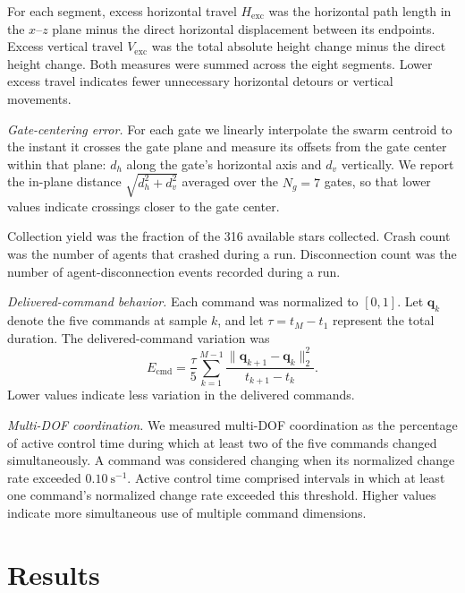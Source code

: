 \documentclass[a4paper,10pt,conference]{ieeeconf}
\begin{document}
For each segment, excess horizontal travel $H_{\mathrm{exc}}$ was the
horizontal path length in the $x$--$z$ plane minus the direct horizontal
displacement between its endpoints. Excess vertical travel
$V_{\mathrm{exc}}$ was the total absolute height change minus the direct
height change. Both measures were summed across the eight segments. Lower
excess travel indicates fewer unnecessary horizontal detours or vertical
movements.

\emph{Gate-centering error.} For each gate we linearly interpolate the swarm
centroid to the instant it crosses the gate plane and measure its offsets from
the gate center within that plane: $d_h$ along the gate's horizontal axis and
$d_v$ vertically. We report the in-plane distance $\sqrt{d_h^2+d_v^2}$ averaged
over the $N_g=7$ gates, so that lower values indicate crossings closer to the
gate center.

Collection yield was the fraction of the 316 available stars collected.
Crash count was the number of agents that crashed during a run.
Disconnection count was the number of agent-disconnection events recorded
during a run.

\emph{Delivered-command behavior.}
Each command was normalized to $[0,1]$. Let $\mathbf{q}_k$ denote the five commands at sample $k$, and let $\tau=t_M-t_1$ represent the total duration. The delivered-command variation was
\begin{equation}
E_{\mathrm{cmd}} = \frac{\tau}{5} \sum_{k=1}^{M-1} \frac{\lVert\mathbf{q}_{k+1}-\mathbf{q}_k\rVert_2^2} {t_{k+1}-t_k}.
\label{eq:command_metrics}
\end{equation}
Lower values indicate less variation in the delivered commands.

\emph{Multi-DOF coordination.}
We measured multi-DOF coordination as the percentage of active control time
during which at least two of the five commands changed simultaneously. A
command was considered changing when its normalized change rate exceeded
$0.10~\mathrm{s^{-1}}$. Active control time comprised intervals in which at
least one command's normalized change rate exceeded this threshold. Higher
values indicate more simultaneous use of multiple command dimensions. 

\section{Results}
\end{document}
